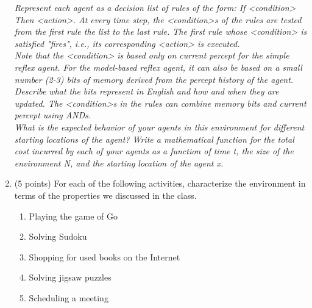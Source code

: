 \documentclass[12pt, letterpaper]{article}
\begin{document}
\begin{enumerate}
  \emph{Represent each agent as a decision list of rules of the form: If <condition> Then <action>.  At every time step, the <condition>s of the rules are tested from the first rule the list to the last rule. The first rule whose <condition> is satisfied "fires", i.e., its  corresponding <action> is executed.}\\
  \emph{Note that the <condition>  is based only on current percept for the simple reflex agent. For the model-based reflex agent, it can also be based on a small number (2-3) bits of memory derived from the percept history of the agent. Describe what the bits represent in English and how and when they are updated. The <condition>s in the rules can combine memory bits and current percept using ANDs.}\\
  \emph{What is the expected behavior of your agents in this environment for different starting locations of the agent? Write a mathematical function for the total cost incurred by each of your agents as a function of time t, the size of the environment N, and the starting location of the agent x.}

  
  

  \item (5 points) For each of the following activities, characterize the environment in terms of the properties we discussed in the class.
    \begin{enumerate}
      \item Playing the game of Go
      \item Solving Sudoku
      \item Shopping for used books on the Internet
      \item Solving jigsaw puzzles
      \item Scheduling a meeting
    \end{enumerate}

 
\end{enumerate}
    
    
\end{document}
